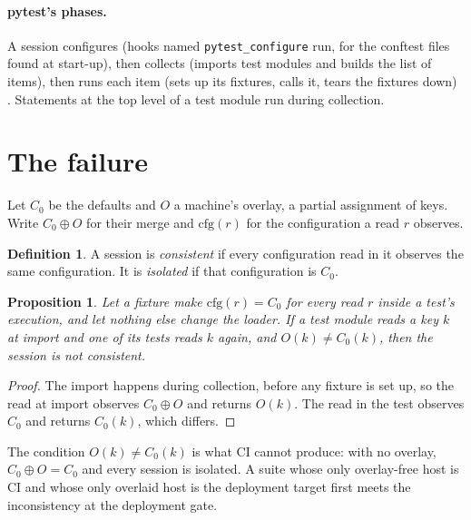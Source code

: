 \documentclass[11pt]{article}
\theoremstyle{plain}
\newtheorem{proposition}[theorem]{Proposition}
\theoremstyle{definition}
\newtheorem{definition}[theorem]{Definition}
\theoremstyle{remark}
\newcommand{\code}[1]{\texttt{#1}}
\begin{document}
\paragraph{pytest's phases.} A session configures (hooks named \code{pytest\_configure} run, for
the conftest files found at start-up), then collects (imports test modules and builds the list of
items), then runs each item (sets up its fixtures, calls it, tears the fixtures down)
\cite{pytestdocs}. Statements at the top level of a test module run during collection.

\section{The failure}\label{sec:failure}
Let $C_0$ be the defaults and $O$ a machine's overlay, a partial assignment of keys. Write $C_0
\oplus O$ for their merge and $\mathrm{cfg}(r)$ for the configuration a read $r$ observes.

\begin{definition}
A session is \emph{consistent} if every configuration read in it observes the same
configuration. It is \emph{isolated} if that configuration is $C_0$.
\end{definition}

\begin{proposition}\label{prop:scope}
Let a fixture make $\mathrm{cfg}(r) = C_0$ for every read $r$ inside a test's execution, and let
nothing else change the loader. If a test module reads a key $k$ at import and one of its tests
reads $k$ again, and $O(k) \neq C_0(k)$, then the session is not consistent.
\end{proposition}

\begin{proof}
The import happens during collection, before any fixture is set up, so the read at import observes
$C_0 \oplus O$ and returns $O(k)$. The read in the test observes $C_0$ and returns $C_0(k)$, which
differs.
\end{proof}

The condition $O(k) \neq C_0(k)$ is what CI cannot produce: with no overlay, $C_0 \oplus O = C_0$
and every session is isolated. A suite whose only overlay-free host is CI and whose only overlaid
host is the deployment target first meets the inconsistency at the deployment gate.
\end{document}
